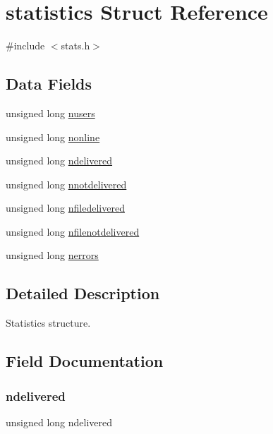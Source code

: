 \hypertarget{structstatistics}{}\section{statistics Struct Reference}
\label{structstatistics}


{\ttfamily \#include $<$stats.\+h$>$}

\subsection*{Data Fields}
\begin{DoxyCompactItemize}
\item 
unsigned long \hyperlink{structstatistics_adacd907234b18252c5e1ec947deca41f}{nusers}
\item 
unsigned long \hyperlink{structstatistics_aff99cf9b6aa2d22f48f543a906603ae7}{nonline}
\item 
unsigned long \hyperlink{structstatistics_a08e845e3d8ec6f288e20a4693ff09123}{ndelivered}
\item 
unsigned long \hyperlink{structstatistics_a544cca2dcba9741ea008e54ab3b4eef8}{nnotdelivered}
\item 
unsigned long \hyperlink{structstatistics_a0b799597236f59771d2df823cc295de1}{nfiledelivered}
\item 
unsigned long \hyperlink{structstatistics_a3f46d11b2e9a9b2cf0294f5f55fe3d32}{nfilenotdelivered}
\item 
unsigned long \hyperlink{structstatistics_a6b8853d9bf908c15a1c6444ac8e62c20}{nerrors}
\end{DoxyCompactItemize}


\subsection{Detailed Description}
Statistics structure. 

\subsection{Field Documentation}
\mbox{\label{structstatistics_a08e845e3d8ec6f288e20a4693ff09123}} 
\subsubsection{\texorpdfstring{ndelivered}{ndelivered}}
{\footnotesize\ttfamily unsigned long ndelivered}

